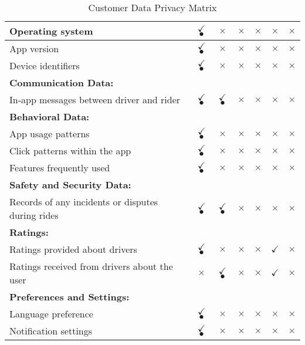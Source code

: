 \begin{table}[h]
\begin{tabular}{|l|c|c|c|c|c|c|}
\hline
Operating system & $\checkmark$$\bullet$ & $\times$ & $\times$ & $\times$ & $\times$ & $\times$ \\
\hline
App version & $\checkmark$$\bullet$ & $\times$ & $\times$ & $\times$ & $\times$ & $\times$ \\
\hline
Device identifiers & $\checkmark$$\bullet$ & $\times$ & $\times$ & $\times$ & $\times$ & $\times$ \\
\hline
\multicolumn{1}{|l|}{\textbf{Communication Data: }} & \multicolumn{1}{c}{} & \multicolumn{1}{c}{} & \multicolumn{1}{c}{} & \multicolumn{1}{c}{} & \multicolumn{1}{c}{} & \multicolumn{1}{c|}{} \\
\hline
In-app messages between driver and rider & $\checkmark$$\bullet$ & $\checkmark$$\bullet$ & $\times$ & $\times$ & $\times$ & $\times$ \\
\hline
\multicolumn{1}{|l|}{\textbf{Behavioral Data: }} & \multicolumn{1}{c}{} & \multicolumn{1}{c}{} & \multicolumn{1}{c}{} & \multicolumn{1}{c}{} & \multicolumn{1}{c}{} & \multicolumn{1}{c|}{} \\
\hline
App usage patterns & $\checkmark$$\bullet$ & $\times$ & $\times$ & $\times$ & $\times$ & $\times$ \\
\hline
Click patterns within the app & $\checkmark$$\bullet$ & $\times$ & $\times$ & $\times$ & $\times$ & $\times$ \\
\hline
Features frequently used & $\checkmark$$\bullet$ & $\times$ & $\times$ & $\times$ & $\times$ & $\times$ \\
\hline
\multicolumn{1}{|l|}{\textbf{Safety and Security Data: }} & \multicolumn{1}{c}{} & \multicolumn{1}{c}{} & \multicolumn{1}{c}{} & \multicolumn{1}{c}{} & \multicolumn{1}{c}{} & \multicolumn{1}{c|}{} \\
\hline
Records of any incidents or disputes during rides & $\checkmark$$\bullet$ & $\checkmark$$\bullet$ & $\times$ & $\times$ & $\times$ & $\times$ \\
\hline
\multicolumn{1}{|l|}{\textbf{Ratings: }} & \multicolumn{1}{c}{} & \multicolumn{1}{c}{} & \multicolumn{1}{c}{} & \multicolumn{1}{c}{} & \multicolumn{1}{c}{} & \multicolumn{1}{c|}{} \\
\hline
Ratings provided about drivers & $\checkmark$$\bullet$ & $\times$ & $\times$ & $\times$ & $\checkmark$ & $\times$ \\
\hline
Ratings received from drivers about the user & $\times$ & $\checkmark$$\bullet$ & $\times$ & $\times$ & $\checkmark$ & $\times$ \\
\hline
\multicolumn{1}{|l|}{\textbf{Preferences and Settings: }} & \multicolumn{1}{c}{} & \multicolumn{1}{c}{} & \multicolumn{1}{c}{} & \multicolumn{1}{c}{} & \multicolumn{1}{c}{} & \multicolumn{1}{c|}{} \\
\hline
Language preference & $\checkmark$$\bullet$ & $\times$ & $\times$ & $\times$ & $\times$ & $\times$ \\
\hline
Notification settings & $\checkmark$$\bullet$ & $\times$ & $\times$ & $\times$ & $\times$ & $\times$ \\
\hline
\end{tabular}
\caption{Customer Data Privacy Matrix}
\label{tab:your_label_here}
\end{table}
